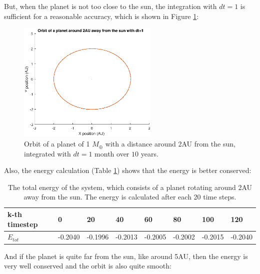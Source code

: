 But, when the planet is not too close to the sun, the integration with $dt=1$ is sufficient for a reasonable accuracy, which is shown in Figure \ref{fig:Planet2AUdt1}:

\begin{figure}[H]
\centering
\includegraphics[width=0.6\textwidth]{Planeet_2AU_dt1_10jaar.eps}
\caption{Orbit of a planet of 1 $M_{\oplus}$ with a distance around 2AU from the sun, integrated with $dt=1$ month over $10$ years.}
    \label{fig:Planet2AUdt1}
\end{figure}

Also, the energy calculation (Table \ref{tab:Planet2AUEnergy}) shows that the energy is better conserved:

\begin{table}[htb]
\centering
\caption{The total energy of the system, which consists of a planet rotating around 2AU away from the sun. The energy is calculated after each 20 time steps.}
\begin{tabular}{|l|l|l|l|l|l|l|l|}
\hline
k-th timestep&0&20&40&60&80&100&120\\ \hline
$E_{tot}$&-0.2040&   -0.1996&   -0.2013&   -0.2005&   -0.2002&   -0.2015&   -0.2040\\ \hline
\end{tabular}

\label{tab:Planet2AUEnergy}
\end{table}

And if the planet is quite far from the sun, like around 5AU, then the energy is very well conserved and the orbit is also quite smooth:

